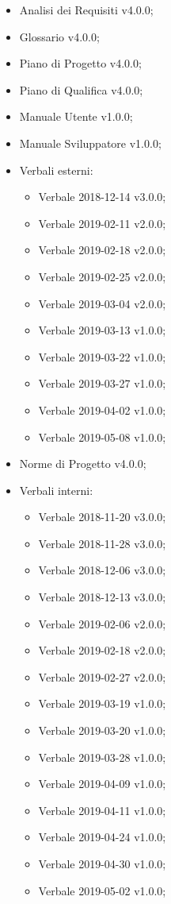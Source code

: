 \documentclass[a4paper,12pt]{article}
\begin{document}
\begin{itemize}
\item Analisi dei Requisiti v4.0.0;
\item Glossario v4.0.0;
\item Piano di Progetto v4.0.0;
\item Piano di Qualifica v4.0.0;
\item Manuale Utente v1.0.0;
\item Manuale Sviluppatore v1.0.0;
\item Verbali esterni:
	\begin{itemize}
		\item Verbale 2018-12-14 v3.0.0;
		\item Verbale 2019-02-11 v2.0.0;
		\item Verbale 2019-02-18 v2.0.0;
		\item Verbale 2019-02-25 v2.0.0;
		\item Verbale 2019-03-04 v2.0.0;
		\item Verbale 2019-03-13 v1.0.0;
		\item Verbale 2019-03-22 v1.0.0;
		\item Verbale 2019-03-27 v1.0.0;
		\item Verbale 2019-04-02 v1.0.0;
		\item Verbale 2019-05-08 v1.0.0;
	\end{itemize}
\item Norme di Progetto v4.0.0;
\item Verbali interni:
	\begin{itemize}
		\item Verbale 2018-11-20 v3.0.0;
		\item Verbale 2018-11-28 v3.0.0;
		\item Verbale 2018-12-06 v3.0.0;
		\item Verbale 2018-12-13 v3.0.0;
		\item Verbale 2019-02-06 v2.0.0;
		\item Verbale 2019-02-18 v2.0.0;
		\item Verbale 2019-02-27 v2.0.0;
		\item Verbale 2019-03-19 v1.0.0;
		\item Verbale 2019-03-20 v1.0.0;
		\item Verbale 2019-03-28 v1.0.0;
		\item Verbale 2019-04-09 v1.0.0;
		\item Verbale 2019-04-11 v1.0.0;
		\item Verbale 2019-04-24 v1.0.0;
		\item Verbale 2019-04-30 v1.0.0;
		\item Verbale 2019-05-02 v1.0.0;
	\end{itemize}
\end{itemize}
\end{document}
